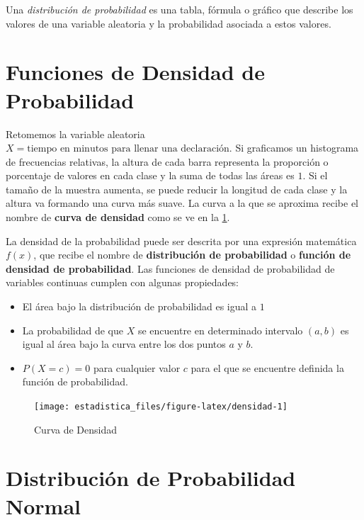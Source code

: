 \documentclass[]{book}
\providecommand{\tightlist}{%
  \setlength{\itemsep}{0pt}\setlength{\parskip}{0pt}}
\begin{document}
Una \emph{distribución de probabilidad} es una tabla, fórmula o gráfico que describe los valores de una variable aleatoria y la probabilidad asociada a estos valores.

\hypertarget{funciones-de-densidad-de-probabilidad}{%
\section{Funciones de Densidad de Probabilidad}\label{funciones-de-densidad-de-probabilidad}}

Retomemos la variable aleatoria \(X= \text{tiempo en minutos para llenar una declaración}\). Si graficamos un histograma de frecuencias relativas, la altura de cada barra representa la proporción o porcentaje de valores en cada clase y la suma de todas las áreas es \(1\). Si el tamaño de la muestra aumenta, se puede reducir la longitud de cada clase y la altura va formando una curva más suave. La curva a la que se aproxima recibe el nombre de \textbf{curva de densidad} como se ve en la \ref{fig:densidad}.

La densidad de la probabilidad puede ser descrita por una expresión matemática \(f\left(x\right)\), que recibe el nombre de \textbf{distribución de probabilidad} o \textbf{función de densidad de probabilidad}. Las funciones de densidad de probabilidad de variables continuas cumplen con algunas propiedades:

\begin{itemize}
\tightlist
\item
  El área bajo la distribución de probabilidad es igual a \(1\)
\item
  La probabilidad de que \(X\) se encuentre en determinado intervalo \(\left(a,b\right)\) es igual al área bajo la curva entre los dos puntos \(a\) y \(b\).
\item
  \(P\left(X=c\right)=0\) para cualquier valor \(c\) para el que se encuentre definida la función de probabilidad.
\end{itemize}

\begin{figure}[h]

{\centering \texttt{[image: estadistica\_files/figure-latex/densidad-1]} 

}

\caption{Curva de Densidad}\label{fig:densidad}
\end{figure}

\hypertarget{distribucion-de-probabilidad-normal}{%
\section{Distribución de Probabilidad Normal}\label{distribucion-de-probabilidad-normal}}
\end{document}
